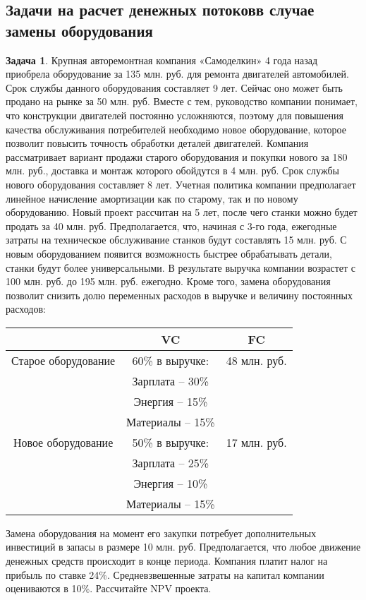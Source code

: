 \documentclass[a4paper, 14pt]{article}
\theoremstyle{plain} %
\theoremstyle{definition} %
\newtheorem{problem}{Задача}[subsection]
\theoremstyle{remark} %
\begin{document}
\subsection{Задачи на расчет денежных потоковв случае замены оборудования}

\begin{problem}
	Крупная  авторемонтная  компания  «Самоделкин»  4  года  назад  приобрела оборудование за 135 млн. руб. для ремонта двигателей автомобилей. Срок службы данного оборудования составляет 9 лет. Сейчас оно может быть продано на рынке за 50 млн. руб. Вместе с тем, руководство компании понимает, что конструкции двигателей постоянно усложняются, поэтому для повышения качества обслуживания потребителей необходимо новое оборудование, которое позволит повысить точность обработки деталей двигателей. Компания рассматривает вариант продажи старого оборудования и покупки нового за 180 млн.  руб.,  доставка  и  монтаж которого обойдутся  в  4  млн.  руб.  Срок  службы  нового оборудования  составляет  8  лет.  Учетная  политика  компании  предполагает  линейное начисление амортизации как по старому, так и по новому оборудованию. Новый проект рассчитан на 5 лет, после чего станки можно будет продать за 40 млн. руб. Предполагается, что, начиная с 3-го года, ежегодные затраты на техническое обслуживание станков будут составлять  15  млн.  руб.  С  новым  оборудованием  появится  возможность  быстрее обрабатывать  детали,  станки  будут  более  универсальными.  В  результате  выручка компании  возрастет  с  100  млн.  руб.  до  195  млн.  руб.  ежегодно.  Кроме  того,  замена оборудования  позволит  снизить  долю  переменных  расходов  в  выручке  и  величину постоянных расходов:
	\begin{center}
	\begin{tabular}{|c|c|c|}
	\hline
	                    & VC               & FC            \\
	\hline
	Старое оборудование & 60\% в выручке:  & 48 млн. руб.  \\
	\hline
	                    & Зарплата – 30\%  &               \\
	\hline
	                    & Энергия – 15\%   &               \\
	\hline
	                    & Материалы – 15\% &               \\
	\hline
	Новое оборудование  & 50\% в выручке:  & 17 млн. руб.  \\
	\hline
	                    & Зарплата – 25\%  &               \\
	\hline
	                    & Энергия – 10\%   &               \\
	\hline
	                    & Материалы – 15\% &               \\
	\hline
	\end{tabular}
	\end{center}
	Замена  оборудования  на  момент  его закупки  потребует  дополнительных инвестиций  в  запасы  в  размере  10  млн.  руб.  Предполагается,  что  любое  движение денежных средств происходит в конце периода. Компания платит налог на прибыль по ставке 24\%.  Средневзвешенные  затраты  на  капитал  компании  оцениваются  в  10\%. Рассчитайте NPV проекта.


\end{problem}
\end{document}
